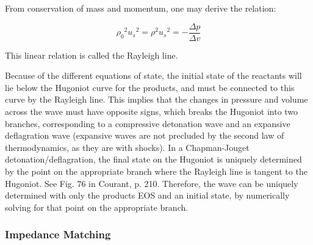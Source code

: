 \documentclass[twocolumn,10pt]{asme2ej}
\begin{document}
From conservation of mass and momentum, one may derive the relation: 

\[{\rho _0}^2{u_s}^2 = {\rho ^2}{u_s}^2 =  - \frac{{\Delta p}}{{\Delta v}}\]

This linear relation is called the Rayleigh line. 

Because of the different equations of state, the initial state of the reactants will lie below the Hugoniot curve for the products, and must be connected to this curve by the Rayleigh line. This implies that the changes in pressure and volume across the wave must have opposite signs, which breaks the Hugoniot into two branches\cite{RN1011}, corresponding to a compressive detonation wave and an expansive deflagration wave (expansive waves are not precluded by the second law of thermodynamics, as they are with shocks). In a Chapman-Jouget detonation/deflagration, the final state on the Hugoniot is uniquely determined by the point on the appropriate branch where the Rayleigh line is tangent to the Hugoniot. See Fig. 76 in Courant\cite{RN1011}, p. 210. Therefore, the wave can be uniquely determined with only the products EOS and an initial state, by numerically solving for that point on the appropriate branch.  

\subsubsection{Impedance Matching}

\end{document}
